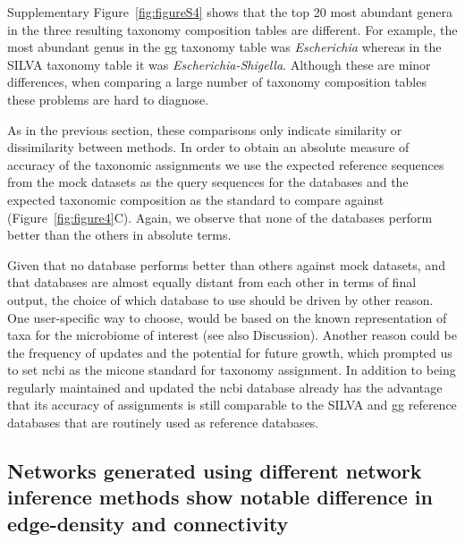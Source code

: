   Supplementary Figure~\ref{fig:figureS4} shows that the top 20 most abundant genera in the three resulting taxonomy composition tables are different.
  For example, the most abundant genus in the \ac{gg} taxonomy table was \textit{Escherichia} whereas in the SILVA taxonomy table it was \textit{Escherichia-Shigella}.
  Although these are minor differences, when comparing a large number of taxonomy composition tables these problems are hard to diagnose.

  As in the previous section, these comparisons only indicate similarity or dissimilarity between methods.
  In order to obtain an absolute measure of accuracy of the taxonomic assignments we use the expected reference sequences from the mock datasets as the query sequences for the databases and the expected taxonomic composition as the standard to compare against (Figure~\ref{fig:figure4}C).
  Again, we observe that none of the databases perform better than the others in absolute terms.

  Given that no database performs better than others against mock datasets, and that databases are almost equally distant from each other in terms of final output, the choice of which database to use should be driven by other reason.
  One user-specific way to choose, would be based on the known representation of taxa for the microbiome of interest (see also Discussion). Another reason could be the frequency of updates and the potential for future growth, which prompted us to set \ac{ncbi} as the \ac{micone} standard for taxonomy assignment.
 In addition to being regularly maintained and updated the \ac{ncbi} database already has the advantage that its accuracy of assignments is still comparable to the SILVA and \ac{gg} reference databases that are routinely used as reference databases.

  \FloatBarrier

  \subsection*{Networks generated using different network inference methods show notable difference in edge-density and connectivity}


